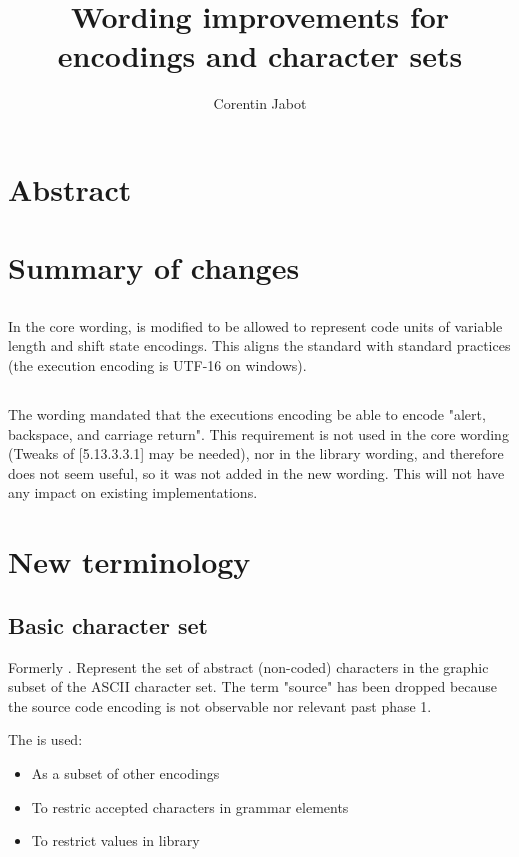 \documentclass{wg21}
\title{Wording improvements for encodings and character sets}
\author{Corentin Jabot}{corentin.jabot@gmail.com}
\begin{document}
\maketitle


\section{Abstract}


\section{Summary of changes}

\subsection{}

In the core wording,  is modified to be allowed to represent code units of variable length and shift state encodings.
This aligns the standard with standard practices (the execution encoding is UTF-16 on windows).

\subsection{}

The wording mandated that the executions encoding be able to encode "alert, backspace, and carriage return". This requirement is not used
in the core wording (Tweaks of [5.13.3.3.1] may be needed), nor in the library wording, and therefore does not seem useful, so it was not added in the new wording.
This will not have any impact on existing implementations.

\section{New terminology}

\subsection{Basic character set}

Formerly . Represent the set of abstract (non-coded) characters in the graphic subset of the ASCII character set.
The term "source" has been dropped because the source code encoding is not observable nor relevant past phase 1.

The  is used:
\begin{itemize}
    \item As a subset of other encodings
    \item To restric accepted characters in grammar elements
    \item To restrict values in library
\end{itemize}
\end{document}
